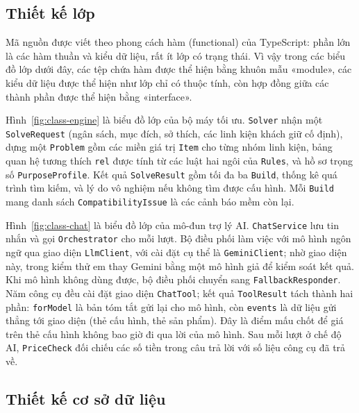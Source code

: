 \subsection{Thiết kế lớp}

Mã nguồn được viết theo phong cách hàm (functional) của TypeScript: phần lớn là các hàm thuần và kiểu dữ liệu, rất ít lớp có trạng thái. Vì vậy trong các biểu đồ lớp dưới đây, các tệp chứa hàm được thể hiện bằng khuôn mẫu «module», các kiểu dữ liệu được thể hiện như lớp chỉ có thuộc tính, còn hợp đồng giữa các thành phần được thể hiện bằng «interface».


Hình~\ref{fig:class-engine} là biểu đồ lớp của bộ máy tối ưu. \texttt{Solver} nhận một \texttt{SolveRequest} (ngân sách, mục đích, sở thích, các linh kiện khách giữ cố định), dựng một \texttt{Problem} gồm các miền giá trị \texttt{Item} cho từng nhóm linh kiện, bảng quan hệ tương thích \texttt{rel} được tính từ các luật hai ngôi của \texttt{Rules}, và hồ sơ trọng số \texttt{PurposeProfile}. Kết quả \texttt{SolveResult} gồm tối đa ba \texttt{Build}, thống kê quá trình tìm kiếm, và lý do vô nghiệm nếu không tìm được cấu hình. Mỗi \texttt{Build} mang danh sách \texttt{CompatibilityIssue} là các cảnh báo mềm còn lại.


Hình~\ref{fig:class-chat} là biểu đồ lớp của mô-đun trợ lý AI. \texttt{ChatService} lưu tin nhắn và gọi \texttt{Orchestrator} cho mỗi lượt. Bộ điều phối làm việc với mô hình ngôn ngữ qua giao diện \texttt{LlmClient}, với cài đặt cụ thể là \texttt{GeminiClient}; nhờ giao diện này, trong kiểm thử em thay Gemini bằng một mô hình giả để kiểm soát kết quả. Khi mô hình không dùng được, bộ điều phối chuyển sang \texttt{FallbackResponder}. Năm công cụ đều cài đặt giao diện \texttt{ChatTool}; kết quả \texttt{ToolResult} tách thành hai phần: \texttt{forModel} là bản tóm tắt gửi lại cho mô hình, còn \texttt{events} là dữ liệu gửi thẳng tới giao diện (thẻ cấu hình, thẻ sản phẩm). Đây là điểm mấu chốt để giá trên thẻ cấu hình không bao giờ đi qua lời của mô hình. Sau mỗi lượt ở chế độ AI, \texttt{PriceCheck} đối chiếu các số tiền trong câu trả lời với số liệu công cụ đã trả về.

\subsection{Thiết kế cơ sở dữ liệu}

